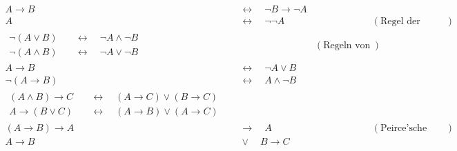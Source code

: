 \begin{align*}
    A \to B & \quad \leftrightarrow\quad \neg B \to \neg A \\
    A & \quad\leftrightarrow\quad \neg\neg A && (\text{Regel der doppelten Verneinung}) \\[1em]
    \begin{split}
        \neg (A \lor B) & \quad\leftrightarrow\quad \neg A \land \neg B\\
        \neg(A \land B) & \quad\leftrightarrow\quad \neg A \lor \neg B  %
    \end{split} && (\text{Regeln von De Morgan}) \\[1em]
    A\to B & \quad\leftrightarrow\quad  \neg A \lor B \\
    \neg (A\to B) & \quad\leftrightarrow\quad  A \land \neg B \\[1em]
    \begin{split}
        (A\land B) \to C & \quad\leftrightarrow\quad (A\to C) \lor (B\to C) \\ %
        A \to (B\lor C) & \quad\leftrightarrow\quad (A\to B) \lor (A\to C) %
    \end{split} \\[1em]
    (A\to B)\to A &\quad \to\quad A && (\text{Peirce’sche Regel}) \\
    A\to B & \quad \lor\quad B\to C
\end{align*}
\endgroup

 
 
 
 
